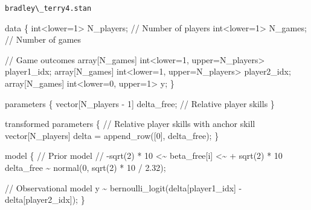 \documentclass[
  letterpaper,
  DIV=11,
  numbers=noendperiod]{scrartcl}
\newenvironment{Shaded}{\begin{snugshade}}{\end{snugshade}}
\newcommand{\CommentTok}[1]{\textcolor[rgb]{0.37,0.37,0.37}{#1}}
\newcommand{\DataTypeTok}[1]{\textcolor[rgb]{0.68,0.00,0.00}{#1}}
\newcommand{\DecValTok}[1]{\textcolor[rgb]{0.68,0.00,0.00}{#1}}
\newcommand{\FloatTok}[1]{\textcolor[rgb]{0.68,0.00,0.00}{#1}}
\newcommand{\KeywordTok}[1]{\textcolor[rgb]{0.00,0.23,0.31}{#1}}
\newcommand{\NormalTok}[1]{\textcolor[rgb]{0.00,0.23,0.31}{#1}}
\begin{document}
\begin{codelisting}

\caption{\texttt{bradley\textbackslash\_terry4.stan}}

\begin{Shaded}
\begin{Highlighting}[]
\KeywordTok{data}\NormalTok{ \{}
  \DataTypeTok{int}\NormalTok{\textless{}}\KeywordTok{lower}\NormalTok{=}\DecValTok{1}\NormalTok{\textgreater{} N\_players; }\CommentTok{// Number of players}
  \DataTypeTok{int}\NormalTok{\textless{}}\KeywordTok{lower}\NormalTok{=}\DecValTok{1}\NormalTok{\textgreater{} N\_games;   }\CommentTok{// Number of games}

  \CommentTok{// Game outcomes}
  \DataTypeTok{array}\NormalTok{[N\_games] }\DataTypeTok{int}\NormalTok{\textless{}}\KeywordTok{lower}\NormalTok{=}\DecValTok{1}\NormalTok{, }\KeywordTok{upper}\NormalTok{=N\_players\textgreater{} player1\_idx;}
  \DataTypeTok{array}\NormalTok{[N\_games] }\DataTypeTok{int}\NormalTok{\textless{}}\KeywordTok{lower}\NormalTok{=}\DecValTok{1}\NormalTok{, }\KeywordTok{upper}\NormalTok{=N\_players\textgreater{} player2\_idx;}
  \DataTypeTok{array}\NormalTok{[N\_games] }\DataTypeTok{int}\NormalTok{\textless{}}\KeywordTok{lower}\NormalTok{=}\DecValTok{0}\NormalTok{, }\KeywordTok{upper}\NormalTok{=}\DecValTok{1}\NormalTok{\textgreater{} y;}
\NormalTok{\}}

\KeywordTok{parameters}\NormalTok{ \{}
  \DataTypeTok{vector}\NormalTok{[N\_players {-} }\DecValTok{1}\NormalTok{] delta\_free; }\CommentTok{// Relative player skills}
\NormalTok{\}}

\KeywordTok{transformed parameters}\NormalTok{ \{}
  \CommentTok{// Relative player skills with anchor skill}
  \DataTypeTok{vector}\NormalTok{[N\_players] delta = append\_row([}\DecValTok{0}\NormalTok{]\textquotesingle{}, delta\_free);}
\NormalTok{\}}

\KeywordTok{model}\NormalTok{ \{}
  \CommentTok{// Prior model}
  \CommentTok{// {-}sqrt(2) * 10 \textless{}\textasciitilde{} beta\_free[i] \textless{}\textasciitilde{} + sqrt(2) * 10}
\NormalTok{  delta\_free \textasciitilde{} normal(}\DecValTok{0}\NormalTok{, sqrt(}\DecValTok{2}\NormalTok{) * }\DecValTok{10}\NormalTok{ / }\FloatTok{2.32}\NormalTok{);}

  \CommentTok{// Observational model}
\NormalTok{  y \textasciitilde{} bernoulli\_logit(delta[player1\_idx] {-} delta[player2\_idx]);}
\NormalTok{\}}


\end{Highlighting}
\end{Shaded}
\end{codelisting}
\end{document}
